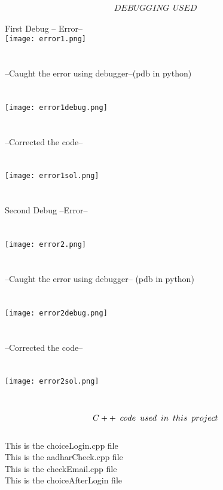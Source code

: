 \documentclass[11pt]{article}
\begin{document}
$$DEBUGGING \hspace{5pt} USED$$\\
First Debug -- Error--\\
\texttt{[image: error1.png]}\\
                               \\\\
--Caught the error using debugger--(pdb in python)\\
                               \\\\
\texttt{[image: error1debug.png]}\\
                               \\\\
--Corrected the code--\\
                               \\\\
\texttt{[image: error1sol.png]}\\
                               \\\\
Second Debug --Error--\\
                               \\\\
\texttt{[image: error2.png]}\\
                               \\\\
--Caught the error using debugger-- (pdb in python)\\
                               \\\\
\texttt{[image: error2debug.png]}\\
                               \\\\
--Corrected the code--\\
                               \\\\
\texttt{[image: error2sol.png]}\\
                               \\\\






$$\LARGE{C++ \hspace{5pt}code \hspace{5pt}used \hspace{5pt}in \hspace{5pt}this\hspace{5pt} project}$$\\
This is the choiceLogin.cpp file\\

This is the aadharCheck.cpp file\\

This is the checkEmail.cpp file\\

This is the choiceAfterLogin file\\

\end{document}
